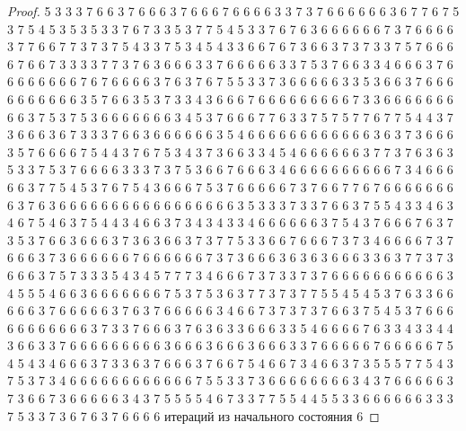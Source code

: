 \begin{proof}
	5 3 3 3 7 6 6 3 7 6 6 6 3 7 6 6 6 7 6 6 6 6 3 3 7 3 7 6 6 6 6 6 6 3 6 7 7 6 7 5 3 7 5 4 5 3 5 3 5 3 3 7 6 7 3 3 5 3 7 7 5 4 5 3 3 7 6 7 6 3 6 6 6 6 6 6 7 3 7 6 6 6 6 3 7 7 6 6 7 7 3 7 3 7 5 4 3 3 7 5 3 4 5 4 3 3 6 6 7 6 7 3 6 6 3 7 3 7 3 3 7 5 7 6 6 6 6 7 6 6 7 3 3 3 3 7 7 3 7 6 3 6 6 6 3 3 7 6 6 6 6 6 3 3 7 5 3 7 6 6 3 3 4 6 6 6 3 7 6 6 6 6 6 6 6 6 7 6 7 6 6 6 6 3 7 6 3 7 6 7 5 5 3 3 7 3 6 6 6 6 6 3 3 5 3 6 6 3 7 6 6 6 6 6 6 6 6 6 6 3 5 7 6 6 3 5 3 7 3 3 4 3 6 6 6 7 6 6 6 6 6 6 6 6 6 7 3 3 6 6 6 6 6 6 6 6 6 3 7 5 3 7 5 3 6 6 6 6 6 6 6 3 4 5 3 7 6 6 6 7 7 6 3 3 7 5 7 5 7 7 6 7 7 5 4 4 3 7 3 6 6 6 3 6 7 3 3 3 7 6 6 3 6 6 6 6 6 6 3 5 4 6 6 6 6 6 6 6 6 6 6 6 6 3 6 3 7 3 6 6 6 3 5 7 6 6 6 6 7 5 4 4 3 7 6 7 5 3 4 3 7 3 6 6 3 3 4 5 4 6 6 6 6 6 6 3 7 7 3 7 6 3 6 3 5 3 3 7 5 3 7 6 6 6 6 3 3 3 7 3 7 5 3 6 6 7 6 6 6 3 4 6 6 6 6 6 6 6 6 6 6 7 3 4 6 6 6 6 6 3 7 7 5 4 5 3 7 6 7 5 4 3 6 6 6 7 5 3 7 6 6 6 6 6 7 3 7 6 6 7 7 6 7 6 6 6 6 6 6 6 6 3 7 6 3 6 6 6 6 6 6 6 6 6 6 6 6 6 6 6 6 6 3 5 3 3 3 7 3 3 7 6 6 3 7 5 5 4 3 3 4 6 3 4 6 7 5 4 6 3 7 5 4 4 3 4 6 6 3 7 3 4 3 4 3 3 4 6 6 6 6 6 6 3 7 5 4 3 7 6 6 6 7 6 3 7 3 5 3 7 6 6 3 6 6 6 3 7 3 6 3 6 6 3 7 3 7 7 5 3 3 6 6 7 6 6 6 7 3 7 3 4 6 6 6 6 7 3 7 6 6 6 3 7 3 6 6 6 6 6 6 7 6 6 6 6 6 6 7 3 7 3 6 6 6 3 6 3 6 3 6 6 6 3 3 6 3 7 7 3 7 3 6 6 6 3 7 5 7 3 3 3 5 4 3 4 5 7 7 7 3 4 6 6 6 7 3 7 3 3 7 3 7 6 6 6 6 6 6 6 6 6 6 6 3 4 5 5 5 4 6 6 3 6 6 6 6 6 6 6 7 5 3 7 5 3 6 3 7 7 3 7 3 7 7 5 5 4 5 4 5 3 7 6 3 3 6 6 6 6 6 3 7 6 6 6 6 6 3 7 6 3 7 6 6 6 6 6 3 4 6 6 7 3 7 3 7 3 7 6 6 3 7 5 4 5 3 7 6 6 6 6 6 6 6 6 6 6 6 3 7 3 3 7 6 6 6 3 7 6 3 6 3 3 6 6 6 3 3 5 4 6 6 6 6 7 6 3 3 4 3 3 4 4 3 6 6 3 3 7 6 6 6 6 6 6 6 6 6 3 6 6 6 3 6 6 6 3 6 6 6 3 3 7 6 6 6 6 6 7 6 6 6 6 6 7 5 4 5 4 3 4 6 6 6 3 7 3 3 6 3 7 6 6 6 3 7 6 6 7 5 4 6 6 7 3 4 6 6 3 7 3 5 5 5 7 7 5 4 3 7 5 3 7 3 4 6 6 6 6 6 6 6 6 6 6 6 6 7 5 5 3 3 7 3 6 6 6 6 6 6 6 6 3 4 3 7 6 6 6 6 6 3 7 3 6 6 7 3 6 6 6 6 6 3 4 3 7 5 5 5 5 4 6 7 3 3 7 7 5 5 4 4 5 5 3 3 6 6 6 6 6 6 3 3 3 7 5 3 3 7 3 6 7 6 3 7 6 6 6 6 
	\newline
	 итераций из начального состояния 6
	\newline

\end{proof}
